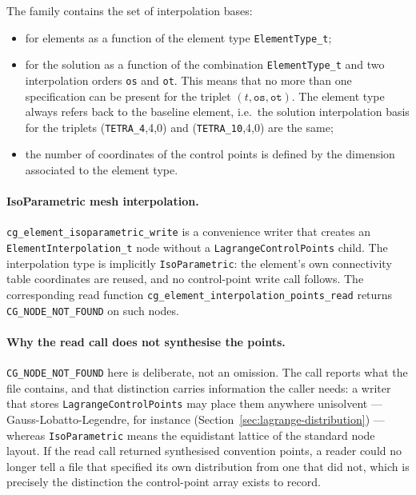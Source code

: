 \documentclass[11pt,letterpaper]{article}
\newenvironment{v2quote}
  {\begin{v2quoteframe}%
   \noindent{\footnotesize\sffamily\bfseries\color{cgnsblue}v2 text}%
   \nopagebreak\par\nopagebreak\vspace{0.15em}}
  {\end{v2quoteframe}}
\begin{document}
\begin{v2quote}
The family contains the set of interpolation bases:
\begin{itemize}
  \item for elements as a function of the element type \texttt{ElementType\_t};
  \item for the solution as a function of the combination \texttt{ElementType\_t} and two
    interpolation orders \texttt{os} and \texttt{ot}.  This means that no more than one
    specification can be present for the triplet $(t, \texttt{os}, \texttt{ot})$.  The element
    type always refers back to the baseline element, i.e.\ the solution interpolation basis for
    the triplets (\texttt{TETRA\_4},4,0) and (\texttt{TETRA\_10},4,0) are the same;
  \item the number of coordinates of the control points is defined by the dimension associated
    to the element type.
\end{itemize}
\end{v2quote}

\paragraph{IsoParametric mesh interpolation.}
\texttt{cg\_element\_isoparametric\_write} is a convenience writer that creates an
\texttt{ElementInterpolation\_t} node without a \texttt{LagrangeControlPoints} child.  The
interpolation type is implicitly
\texttt{IsoParametric}: the element's own connectivity table coordinates are reused, and no
control-point write call follows.  The corresponding read function
\texttt{cg\_element\_interpolation\_points\_read} returns \texttt{CG\_NODE\_NOT\_FOUND} on such
nodes.

\paragraph{Why the read call does not synthesise the points.}
\texttt{CG\_NODE\_NOT\_FOUND} here is deliberate, not an omission.  The call reports what the
file contains, and that distinction carries information the caller needs: a writer that stores
\texttt{LagrangeControlPoints} may place them anywhere unisolvent --- Gauss-Lobatto-Legendre,
for instance (Section~\ref{sec:lagrange-distribution}) --- whereas
\texttt{IsoParametric} means the equidistant lattice of the standard node layout.  If the read
call returned synthesised convention points, a reader could no longer tell a file that
specified its own distribution from one that did not, which is precisely the distinction the
control-point array exists to record.
\end{document}
